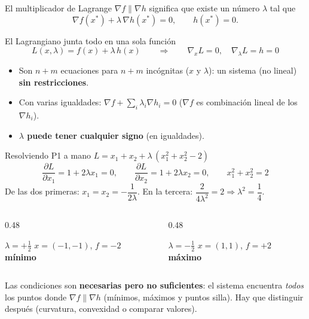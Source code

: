 \documentclass[aspectratio=169]{beamer}
\newcommand{\grad}{\nabla}
\newcommand{\xs}{x^\ast}
\begin{document}
\begin{frame}{El multiplicador de Lagrange}
  $\grad f\parallel\grad h$ significa que existe un número $\lambda$ tal que
  \[ \grad f(\xs)+\lambda\,\grad h(\xs)=0,\qquad h(\xs)=0 . \]
  \begin{block}{El Lagrangiano junta todo en una sola función}
    \[ L(x,\lambda)=f(x)+\lambda\,h(x)\qquad\Longrightarrow\qquad
    \grad_x L=0,\quad \grad_\lambda L=h=0 \]
  \end{block}
  \begin{itemize}
    \item Son $n+m$ ecuaciones para $n+m$ incógnitas ($x$ y $\lambda$): un sistema (no lineal) \textbf{sin restricciones}.
    \item Con varias igualdades: $\grad f+\sum_i\lambda_i\grad h_i=0$ ($\grad f$ es combinación lineal de los $\grad h_i$).
    \item \textbf{$\lambda$ puede tener cualquier signo} (en igualdades).
  \end{itemize}
\end{frame}

\begin{frame}{Resolviendo P1 a mano}
  \small
  $L=x_1+x_2+\lambda\,(x_1^2+x_2^2-2)$
  \[ \frac{\partial L}{\partial x_1}=1+2\lambda x_1=0,\qquad
     \frac{\partial L}{\partial x_2}=1+2\lambda x_2=0,\qquad
     x_1^2+x_2^2=2 \]
  De las dos primeras: $x_1=x_2=-\dfrac{1}{2\lambda}$. En la tercera: $\dfrac{2}{4\lambda^2}=2\Rightarrow\lambda^2=\dfrac14$.
  \begin{columns}[T]
    \begin{column}{0.48\textwidth}
      \begin{exampleblock}{$\lambda=+\tfrac12$}
        $x=(-1,-1)$, $f=-2$\\ \textbf{mínimo}
      \end{exampleblock}
    \end{column}
    \begin{column}{0.48\textwidth}
      \begin{alertblock}{$\lambda=-\tfrac12$}
        $x=(1,1)$, $f=+2$\\ \textbf{máximo}
      \end{alertblock}
    \end{column}
  \end{columns}
  \vspace{0.2cm}
  \normalsize
  Las condiciones son \textbf{necesarias pero no suficientes}: el sistema encuentra \emph{todos} los puntos donde $\grad f\parallel\grad h$ (mínimos, máximos y puntos silla). Hay que distinguir después (curvatura, convexidad o comparar valores).
\end{frame}
\end{document}
